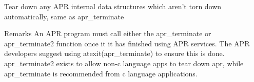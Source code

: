 Tear down any A\-P\-R internal data structures which aren't torn down automatically, same as apr\-\_\-terminate \begin{DoxyRemark}{Remarks}
An A\-P\-R program must call either the apr\-\_\-terminate or apr\-\_\-terminate2 function once it it has finished using A\-P\-R services. The A\-P\-R developers suggest using atexit(apr\-\_\-terminate) to ensure this is done. apr\-\_\-terminate2 exists to allow non-\/c language apps to tear down apr, while apr\-\_\-terminate is recommended from c language applications. 
\end{DoxyRemark}
